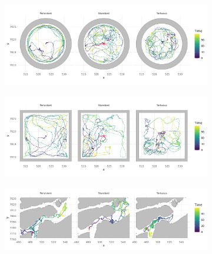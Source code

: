 \documentclass[11pt]{article}
\newcommand {\1}{\mathbb{1}}
\theoremstyle{definition}
\theoremstyle{remark}
\theoremstyle{remark}
\begin{document}
 \begin{figure}[H]
 
   	\hspace{3cm} 
 	 \begin{subfigure}{0.48\textwidth}
 	 	\includegraphics[scale=0.45]{images/crcvm/illustrative_sample_circ}
 	 	\label{fig:illustrativesamplecirc}
 	 \end{subfigure}
  
   	\hspace{3cm} 
  	 \begin{subfigure}{0.48\textwidth}
  		\includegraphics[scale=0.45]{images/crcvm/illustrative_sample_rect}
  		\label{fig:illustrativesamplerect}
 	 \end{subfigure}

 	\hspace{3cm} 
 	\begin{subfigure}{0.48\textwidth}
		\includegraphics[scale=0.45]{images/crcvm/illustrative_sample_fjords}
		\label{fig:illustrativesamplefjords}
	\end{subfigure}



\end{figure}
\end{document}
